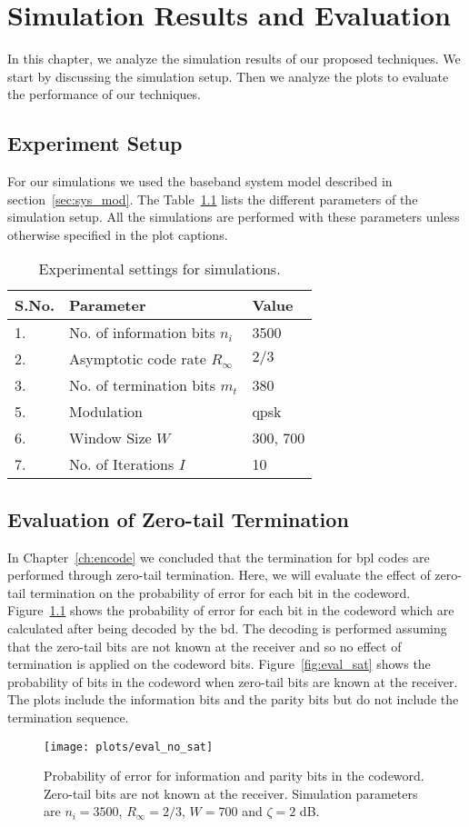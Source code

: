\chapter{Simulation Results and Evaluation}\label{ch:simulation}
In this chapter, we analyze the simulation results of our proposed techniques. We start by discussing the simulation setup. Then we analyze the plots to evaluate the performance of our techniques.

\section{Experiment Setup}
For our simulations we used the baseband system model described in section~\ref{sec:sys_mod}. The Table~\ref{tab:sim_param} lists the different parameters of the simulation setup. All the simulations are performed with these parameters unless otherwise specified in the plot captions.
\begin{table}[htbp]
\centering
\begin{tabular}{|l|l|l|}
  \hline
  \textbf{S.No.} &\textbf{Parameter} &\textbf{Value}\\
  \hline
  \hline
  1. &No. of information bits $n_i$ &3500\\
  \hline
  2. &Asymptotic code rate $R_\infty$ &$2/3$\\
  \hline
  3. &No. of termination bits $m_t$ &380\\
  \hline
  5. &Modulation &\ac{qpsk}\\
  \hline
  6. &Window Size $W$ &300, 700\\
  \hline
  7. &No. of Iterations $I$ &10\\
  \hline
\end{tabular}
\caption{Experimental settings for simulations.}
\label{tab:sim_param}
\end{table}
\section{Evaluation of Zero-tail Termination}
In Chapter~\ref{ch:encode} we concluded that the termination for \ac{bpl} codes are performed through zero-tail termination. Here, we will evaluate the effect of zero-tail termination on the probability of error for each bit in the codeword. Figure~\ref{fig:eval_no_sat} shows the probability of error for each bit in the codeword which are calculated after being decoded by the \ac{bd}. The decoding is performed assuming that the zero-tail bits are not known at the receiver and so no effect of termination is applied on the codeword bits. Figure~\ref{fig:eval_sat} shows the probability of bits in the codeword when zero-tail bits are known at the receiver. The plots include the information bits and the parity bits but do not include the termination sequence.
\begin{figure}[htbp]
  \centering
  \texttt{[image: plots/eval\_no\_sat]}
  \caption{Probability of error for information and parity bits in the codeword. Zero-tail bits are not known at the receiver. Simulation parameters are $n_i=3500$, $R_\infty=2/3$, $W=700$ and $\zeta=2$ dB.}
  \label{fig:eval_no_sat}
\end{figure}

